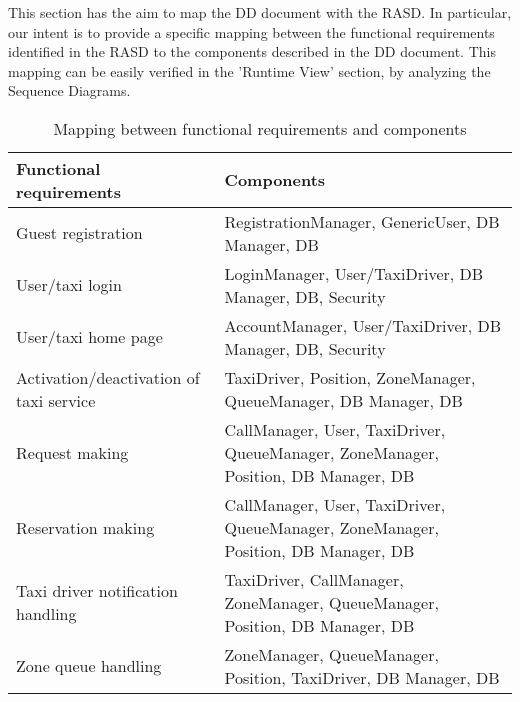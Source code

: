 This section has the aim to map the DD document with the RASD.
\newline
In particular, our intent is to provide a specific mapping between the functional requirements identified in the RASD to the components described in the DD document. This mapping can be easily verified in the 'Runtime View' section, by analyzing the Sequence Diagrams.

\begin{table}[h]
\begin{center}
    \begin{tabular}{|l|p{}|}
        \hline
        {\bf Functional requirements}  & {\bf Components}\\
        \hline
        Guest registration & RegistrationManager, GenericUser, DB Manager, DB\\
        \hline
        User/taxi login & LoginManager, User/TaxiDriver, DB Manager, DB, Security\\
        \hline
        User/taxi home page & AccountManager, User/TaxiDriver, DB Manager, DB, Security\\
        \hline
        Activation/deactivation of taxi service & TaxiDriver, Position, ZoneManager, QueueManager, DB Manager, DB\\
        \hline
        Request making & CallManager, User, TaxiDriver, QueueManager, ZoneManager, Position, DB Manager, DB\\
        \hline
        Reservation making & CallManager, User, TaxiDriver, QueueManager, ZoneManager, Position, DB Manager, DB\\
        \hline
        Taxi driver notification handling & TaxiDriver, CallManager, ZoneManager, QueueManager, Position, DB Manager, DB\\
        \hline
        Zone queue handling & ZoneManager, QueueManager, Position, TaxiDriver, DB Manager, DB \\
        \hline
    \end{tabular}
    \caption{Mapping between functional requirements and components}
\end{center}
\end{table}